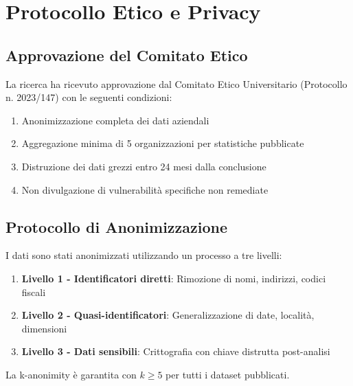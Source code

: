 \section{\texorpdfstring{Protocollo Etico e Privacy}{A.4 - Protocollo Etico e Privacy}}

\subsection{\texorpdfstring{Approvazione del Comitato Etico}{A.4.1 - Approvazione del Comitato Etico}}

La ricerca ha ricevuto approvazione dal Comitato Etico Universitario (Protocollo n. 2023/147) con le seguenti condizioni:

\begin{enumerate}
    \item Anonimizzazione completa dei dati aziendali
    \item Aggregazione minima di 5 organizzazioni per statistiche pubblicate
    \item Distruzione dei dati grezzi entro 24 mesi dalla conclusione
    \item Non divulgazione di vulnerabilità specifiche non remediate
\end{enumerate}

\subsection{\texorpdfstring{Protocollo di Anonimizzazione}{A.4.2 - Protocollo di Anonimizzazione}}

I dati sono stati anonimizzati utilizzando un processo a tre livelli:

\begin{enumerate}
    \item \textbf{Livello 1 - Identificatori diretti}: Rimozione di nomi, indirizzi, codici fiscali
    \item \textbf{Livello 2 - Quasi-identificatori}: Generalizzazione di date, località, dimensioni
    \item \textbf{Livello 3 - Dati sensibili}: Crittografia con chiave distrutta post-analisi
\end{enumerate}

La k-anonimity è garantita con $k \geq 5$ per tutti i dataset pubblicati.




%